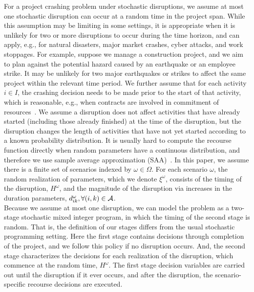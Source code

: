 \documentclass[11pt]{article}
\newcommand{\cA}{{\cal A}}
\begin{document}
	\newline
	For a project crashing problem under stochastic disruptions, we assume at most one stochastic disruption can occur at a random time in the project span. While this assumption may be limiting in some settings, it is appropriate when it is unlikely for two or more disruptions to occur during the time horizon, and can apply, e.g., for natural disasters, major market crashes, cyber attacks, and work stoppages. For example, suppose we manage a construction project, and we aim to plan against the potential hazard caused by an earthquake or an employee strike. It may be unlikely for two major earthquakes or strikes to affect the same project within the relevant time period. We further assume that for each activity \(i \in I\), the crashing decision needs to be made prior to the start of that activity, which is reasonable, e.g., when contracts are involved in commitment of resources~\citep{oberlender1993project}. We assume a disruption does not affect activities that have already started (including those already finished) at the time of the disruption, but the disruption changes the length of activities that have not yet started according to a known probability distribution. It is usually hard to compute the recourse function directly when random parameters have a continuous distribution, and therefore we use sample average approximation (SAA)~\citep{kim2015guide,shapiro2009lectures}. In this paper, we assume there is a finite set of scenarios indexed by \(\omega \in \Omega\). For each scenario \(\omega\), the random realization of parameters, which we denote \(\xi^\omega\), consists of the timing of the disruption, \(H^\omega\), and the magnitude of the disruption via increases in the duration parameters, \(d^\omega_{ik}, \forall (i,k) \in \cA\). \\
	\newline
	Because we assume at most one disruption, we can model the problem as a two-stage stochastic mixed integer program, in which the timing of the second stage is random. That is, the definition of our stages differs from the usual stochastic programming setting. Here the first stage contains decisions through completion of the project, and we follow this policy if no disruption occurs. And, the second stage characterizes the decisions for each realization of the disruption, which commence at the random time, $H^\omega$. The first stage decision variables are carried out until the disruption if it ever occurs, and after the disruption, the scenario-specific recourse decisions are executed.\\
\end{document}
